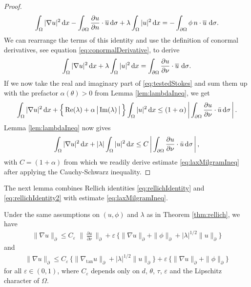 \begin{proof}
  \begin{align*}
    \int_\Omega |\nabla u|^2 \, {\operatorname{d}\!{x}} - \int_{\partial\Omega} \frac{\partial u}{\partial n} \cdot \overline u \, {\operatorname{d}\!{\sigma}} + \lambda \int_\Omega |u|^2 \, {\operatorname{d}\!{x}} = - \int_{\partial\Omega}  \phi\, n \cdot \overline u \, \, {\operatorname{d}\!{\sigma}}.
  \end{align*}
  We can rearrange the terms of this identity and use the definition of conormal derivatives, see equation \eqref{eq:conormalDerivative}, to derive
  \begin{align}
    \label{eq:testedStokes}
    \int_\Omega |\nabla u|^2 \, {\operatorname{d}\!{x}} + \lambda \int_\Omega |u|^2 \, {\operatorname{d}\!{x}} = \int_{\partial\Omega} \frac{\partial u}{\partial \nu} \cdot \overline u \, \, {\operatorname{d}\!{\sigma}}.
  \end{align}
  If we now take the real and imaginary part of \eqref{eq:testedStokes} and sum them up with the prefactor $\alpha(\theta) > 0$ from Lemma \ref{lem:lambdaIneq}, we get
  \begin{align*}
    \int_\Omega |\nabla u|^2 \, {\operatorname{d}\!{x}} + \Big\{ \operatorname{Re}(\lambda) + \alpha\, \big|\operatorname{Im}(\lambda)\,\big|\, \Big\} \int_\Omega |u|^2 \, {\operatorname{d}\!{x}}
    \leq (1 + \alpha) \, \bigg| \int_{\partial\Omega} \frac{\partial u}{\partial \nu} \cdot \bar u \, {\operatorname{d}\!{\sigma}} \, \bigg|\,.
  \end{align*}
  Lemma \ref{lem:lambdaIneq} now gives
  \begin{align*}
    \int_\Omega |\nabla u|^2 \, {\operatorname{d}\!{x}} + |\lambda| \int_\Omega |u|^2 \, {\operatorname{d}\!{x}} \leq C\,  \bigg| \int_{\partial\Omega} \frac{\partial u}{\partial \nu} \cdot \bar u \, {\operatorname{d}\!{\sigma}}\, \bigg|\,,
  \end{align*}
  with $C = (1 + \alpha)$ from which we readily derive estimate \eqref{eq:laxMilgramIneq} after applying the Cauchy-Schwarz inequality.
\end{proof}

The next lemma combines Rellich identities \eqref{eq:rellichIdentity} and \eqref{eq:rellichIdentity2} with estimate \eqref{eq:laxMilgramIneq}.

\begin{lem}
  Under the same assumptions on $(u,\phi)$ and $\lambda$ as in Theorem \ref{thm:rellich}, we have
  \begin{align}
    \label{eq:gradEstimateRellich}
    \| \nabla u\|^{}_\partial \leq C_\varepsilon\, \,\Big\|\, \frac{\partial u}{\partial \nu} \, \Big\|^{}_\partial + \varepsilon \,\Big\{ \|\nabla u\|^{}_\partial + \|\phi\|^{}_\partial +  |\lambda|^{1/2} \| u\|^{}_\partial \Big\}
  \end{align}
  and
  \begin{align}
    \label{eq:gradEstimateRellich2}
    \|\nabla u\|^{}_\partial \leq C_\varepsilon\, \Big\{ \big\|\nabla_{\mathrm{tan}} u \big\|^{}_\partial + |\lambda|^{1/2} \| u\|^{}_\partial \Big\} + \varepsilon\, \Big\{ \|\nabla u\|^{}_\partial + \|\phi\|^{}_\partial \Big\}
  \end{align}
  for all $\varepsilon \in (0,1)$, where $C_\varepsilon$ depends only on $d$, $\theta$, $\tau$, $\varepsilon$ and the Lipschitz character of $\Omega$.
\end{lem}

